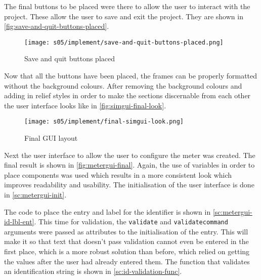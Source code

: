 
    The final buttons to be placed were there to allow the user to interact with the project. 
    These allow the user to save and exit the project. 
    They are shown in \autoref{fig:save-and-quit-buttons-placed}.

    \begin{figure}[!ht]
        \centering
        \texttt{[image: s05/implement/save-and-quit-buttons-placed.png]}
        \caption{Save and quit buttons placed}
        \label{fig:save-and-quit-buttons-placed}
    \end{figure}



    Now that all the buttons have been placed, the frames can be properly formatted without the background colours. 
    After removing the background colours and adding in relief styles in order to make the sections discernable from each other the user interface looks like in \autoref{fig:simgui-final-look}.

    \begin{figure}[!ht]
        \centering
        \texttt{[image: s05/implement/final-simgui-look.png]}
        \caption{Final GUI layout}
        \label{fig:simgui-final-look}
    \end{figure}



    Next the user interface to allow the user to configure the meter was created.
    The final result is shown in \autoref{fig:metergui-final}. 
    Again, the use of variables in order to place components was used which results in a more consistent look which improves readability and usability. 
    The initialisation of the user interface is done in \autoref{sc:metergui-init}.

    The code to place the entry and label for the identifier is shown in \autoref{sc:metergui-id-lbl-ent}.
    This time for validation, the \verb|validate| and \verb|validatecommand| arguments were passed as attributes to the initialisation of the entry. 
    This will make it so that text that doesn't pass validation cannot even be entered in the first place, which is a more robust solution than before, which relied on getting the values after the user had already entered them. 
    The function that validates an identification string is shown in \autoref{sc:id-validation-func}. 

